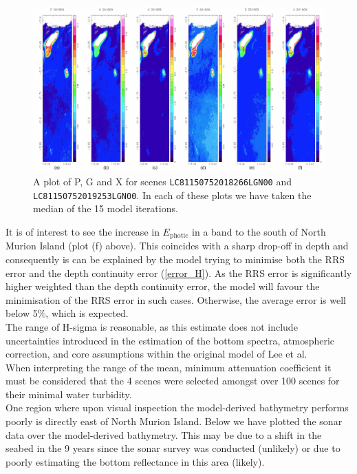 \documentclass[12pt]{article}
\numberwithin{equation}{section}
\begin{document}
\begin{landscape}
\begin{figure}[H]
\centering
\includegraphics[height=0.8\textheight]{tile_3_low.jpg}
\caption{A plot of P, G and X for scenes \texttt{LC81150752018266LGN00} and \texttt{LC81150752019253LGN00}. In
each of these plots we have taken the median of the 15 model iterations.}
\end{figure}
\end{landscape}

It is of interest to see the increase in $E_{\text{photic}}$ in a band to the south of 
North Murion Island (plot (f) above). This coincides with a sharp drop-off in depth 
and consequently is can be explained by the model trying to minimise both the RRS error 
and the depth continuity error (\ref{error_H}). As the RRS error is significantly higher 
weighted than the depth continuity error, the model will favour the minimisation of the 
RRS error in such cases. Otherwise, the average error is well below 5\%, which is 
expected. \\

The range of H-sigma is reasonable, as this estimate does not include uncertainties 
introduced in the estimation of the bottom spectra, atmospheric correction, 
and core assumptions within the original model of Lee et al. \\

When interpreting the range of the mean, minimum attenuation coefficient it must be 
considered that the 4 scenes were selected amongst over 100 scenes for their 
minimal water turbidity. \\

One region where upon visual inspection the model-derived bathymetry performs poorly 
is directly east of North Murion Island. Below we have plotted the sonar data over 
the model-derived bathymetry. This may be due to a shift in the seabed in the 9 years 
since the sonar survey was conducted (unlikely) or due to poorly estimating the bottom 
reflectance in this area (likely). 
\end{document}
